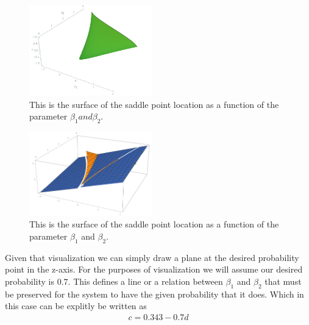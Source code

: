 \documentclass[letterpaper]{article}
\begin{document}
\begin{figure}[t]
\begin{center}
\includegraphics[width=2.1in,angle=0]{./saddle_cubic.png}
\caption{This is the surface of the saddle point location as a function of
the parameter $\beta_1 and \beta_2$.}
\label{fig3}
\end{center}
\end{figure}

\begin{figure}[t]
\begin{center}
\includegraphics[width=2.1in,angle=0]{./cubic_pg.png}
\caption{This is the surface of the saddle point location as a function of
the parameter $\beta_1$ and $\beta_2$.}
\label{fig4}
\end{center}
\end{figure}

Given that visualization we can simply draw a plane at the desired probability point
in the z-axis. For the purposes of visualization we will assume our desired probability
is $0.7$.
This defines a line or a relation between $\beta_1$ and $\beta_2$ that must be
preserved for the system to have the given probability that it does. Which in this case
can be explitly be written as 
\begin{eqnarray} 
  c = 0.343 - 0.7d
\end{eqnarray}
\end{document}
